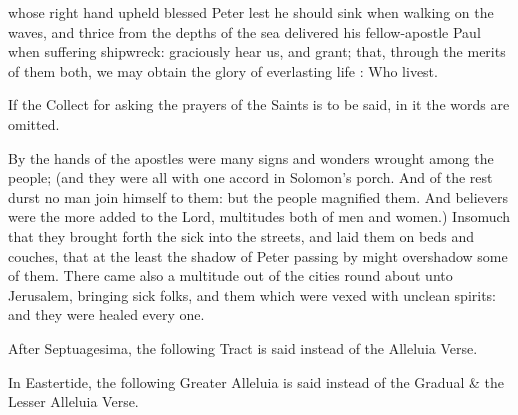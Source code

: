 \collect
{}whose right hand upheld blessed Peter lest he should sink when walking on the waves, and thrice from the depths of the sea delivered his fellow-apostle Paul when suffering shipwreck: graciously hear us, and grant; that, through the merits of them both, we may obtain the glory of everlasting life : Who livest.  

\begin{rubric}
	If the Collect for asking the prayers of the Saints is to be said, in it the words  are omitted.  
\end{rubric}

 By the hands of the apostles were many signs and wonders wrought among the people; (and they were all with one accord in Solomon's porch. And of the rest durst no man join himself to them: but the people magnified them. And believers were the more added to the Lord, multitudes both of men and women.) Insomuch that they brought forth the sick into the streets, and laid them on beds and couches, that at the least the shadow of Peter passing by might overshadow some of them. There came also a multitude out of the cities round about unto Jerusalem, bringing sick folks, and them which were vexed with unclean spirits: and they were healed every one.


\begin{rubric}
    After Septuagesima, the following Tract is said instead of the Alleluia Verse.
\end{rubric}


\begin{rubric}
    In Eastertide, the following Greater Alleluia is said instead of the Gradual \& the Lesser Alleluia Verse.
\end{rubric}


